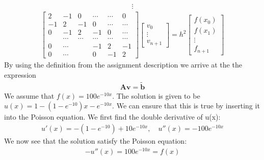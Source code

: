 \documentclass[american,a4paper,12pt]{article}
\renewcommand{\vec}[1]{\mathbf{#1}} %
\begin{document}
\begin{align*}
  \vdots
\end{align*}
\begin{align*}
      \begin{bmatrix}
        2 & -1 & 0 & \cdots & \cdots & 0 \\
        -1 & 2 & -1 & 0 & \cdots & \cdots \\
        0 & -1 & 2 & -1 & 0 & \cdots \\
         & \cdots & \cdots & \cdots & \cdots & \cdots \\
        0 & \cdots & & -1 & 2 & -1 \\
        0 & \cdots & & 0 & -1 & 2
      \end{bmatrix}
      \begin{bmatrix}
        v_0 \\
        \vdots \\
        v_{n+1}
      \end{bmatrix}
= h^2
      \begin{bmatrix}
        f(x_0) \\
        f(x_1) \\
        \vdots \\
        f_{n+1}
      \end{bmatrix}
\end{align*}
By using the definition from the assignment description we arrive at the the expression
\begin{align*}
  \vec{A}\vec{v} = \vec{\tilde{b}}
\end{align*}
We assume that $f(x) = 100e^{-10x}$. The solution is given to be $u(x) = 1 - (1 - e^{-10})x - e^{-10x}$. We can ensure that this is true by inserting it into the Poisson equation. We first find the double derivative of u(x):
\begin{align*}
  u'(x) = -(1 - e^{-10}) + 10e^{-10x}, \quad u''(x) = -100e^{-10x}
\end{align*}
We now see that the solution satisfy the Poisson equation:
\begin{align*}
  -u''(x) = 100e^{-10x} = f(x)
\end{align*}
\end{document}

